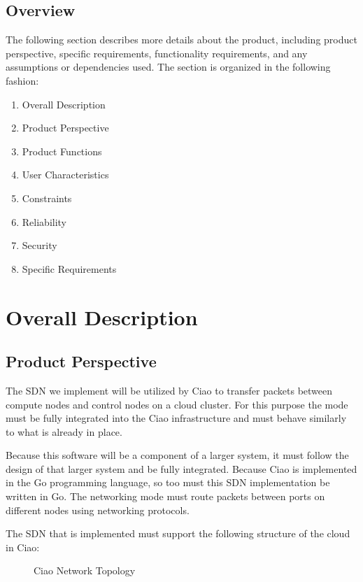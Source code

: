 \documentclass[10pt,letterpaper,onecolumn,draftclsnofoot]{IEEEtran}
\begin{document}



\subsection{Overview}
The following section describes more details about the product, including 
product perspective, specific requirements, functionality requirements, and any
assumptions or dependencies used. The section is organized in the following
fashion:
\begin{enumerate}
	\item Overall Description
	\item Product Perspective
	\item Product Functions
	\item User Characteristics
	\item Constraints
	\item Reliability
	\item Security
	\item Specific Requirements
\end{enumerate}

\section{Overall Description}

\subsection{Product Perspective}

The SDN we implement will be utilized by Ciao to transfer packets between
compute nodes and control nodes on a cloud cluster. For this purpose the mode
must be fully integrated into the Ciao infrastructure and must behave similarly
to what is already in place.

Because this software will be a component of a larger system, it must follow the
design of that larger system and be fully integrated. Because Ciao is
implemented in the Go programming language, so too must this SDN implementation
be written in Go. The networking mode must route packets between ports on
different nodes using networking protocols.

The SDN that is implemented must support the following structure of the cloud in
Ciao:

\begin{figure}[H]
	\caption{Ciao Network Topology~\cite{ciaoNetTopology}}
	\begin{center}
	\end{center}
\end{figure}
\end{document}
